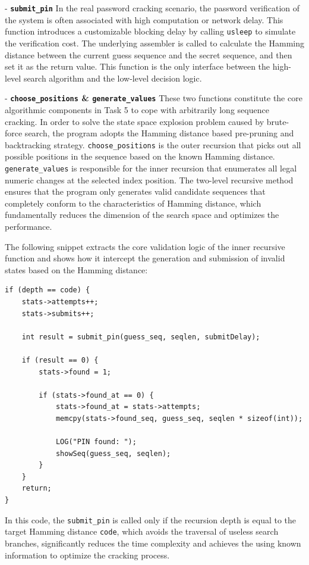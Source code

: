 - \noindent \textbf{\texttt{submit\_pin}} In the real password cracking scenario, the password verification of the system is often associated with high computation or network delay. This function introduces a customizable blocking delay by calling \texttt{usleep} to simulate the verification cost. The underlying assembler is called to calculate the Hamming distance between the current guess sequence and the secret sequence, and then set it as the return value. This function is the only interface between the high-level search algorithm and the low-level decision logic.

- \noindent \textbf{\texttt{choose\_positions} \& \texttt{generate\_values}} These two functions constitute the core algorithmic components in Task 5 to cope with arbitrarily long sequence cracking. In order to solve the state space explosion problem caused by brute-force search, the program adopts the Hamming distance based pre-pruning and backtracking strategy. \texttt{choose\_positions} is the outer recursion that picks out all possible positions in the sequence based on the known Hamming distance. \texttt{generate\_values} is responsible for the inner recursion that enumerates all legal numeric changes at the selected index position. The two-level recursive method ensures that the program only generates valid candidate sequences that completely conform to the characteristics of Hamming distance, which fundamentally reduces the dimension of the search space and optimizes the performance.

The following snippet extracts the core validation logic of the inner recursive function and shows how it intercept the generation and submission of invalid states based on the Hamming distance:

\begin{verbatim}
if (depth == code) {
    stats->attempts++;
    stats->submits++;

    int result = submit_pin(guess_seq, seqlen, submitDelay);

    if (result == 0) {
        stats->found = 1;

        if (stats->found_at == 0) {
            stats->found_at = stats->attempts;
            memcpy(stats->found_seq, guess_seq, seqlen * sizeof(int));

            LOG("PIN found: ");
            showSeq(guess_seq, seqlen);   
        }
    }
    return;
}
\end{verbatim}

In this code, the \texttt{submit\_pin} is called only if the recursion depth is equal to the target Hamming distance \texttt{code}, which avoids the traversal of useless search branches, significantly reduces the time complexity and achieves the using known information to optimize the cracking process.
